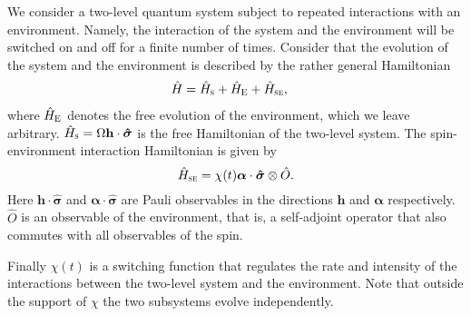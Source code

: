 \documentclass[11pt]{article}
\begin{document}
We consider a two-level quantum system subject to repeated interactions with an environment. Namely, the interaction of the system and the environment will be switched on and off for a finite number of times.  Consider that the evolution of  the system and the environment is described by the rather general Hamiltonian
\begin{align}
\hat{H}&=\hat{H}_{\textsc{s}}+\hat{H}_{\textsc{E}}+\hat{H}_{\textsc{se}},
\end{align}
where  $\hat{H}_{\textsc{E}}$ denotes the free evolution of the environment, which we leave arbitrary.  $\hat{H}_{\textsc{s}}=\Omega \mathbf{h}\cdot \bm{\hat{\sigma}}$ is the free Hamiltonian of the two-level system. The spin-environment interaction Hamiltonian is given by
\begin{equation}
    \hat{H}_{\textsc{se}}= \chi(t) \bm{\alpha}\cdot \bm{\hat{\sigma}} \otimes \hat{{O}}.
\end{equation}
Here  $\mathbf{h}\cdot \bm{\hat{\sigma}}$ and $\bm{\alpha}\cdot \bm{\hat{\sigma}}$ are Pauli observables in the directions $\mathbf{h}$ and $\bm{\alpha}$ respectively.  $\hat{{O}}$ is an observable of the environment, that is, a self-adjoint operator that also commutes with all observables of the spin.

Finally $\chi(t)$ is a switching function that regulates the rate and intensity of the interactions between the two-level system and the environment. Note that outside the support of $\chi$ the two subsystems evolve independently.
\end{document}
